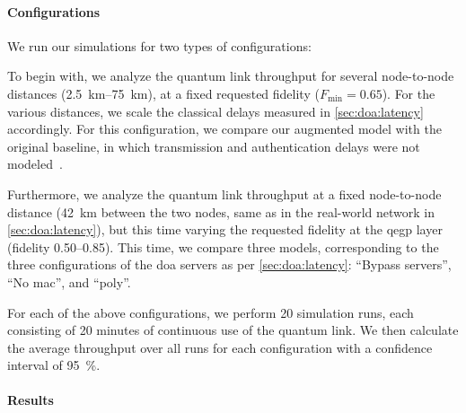 \paragraph{Configurations}

We run our simulations for two types of configurations:
%
\begin{inlinelist}
    \item To begin with, we analyze the quantum link throughput for several node-to-node distances
          (\qtyrange{2.5}{75}{\km}), at a fixed requested fidelity ($F_\text{min}=0.65$). For the
          various distances, we scale the classical delays measured in \cref{sec:doa:latency}
          accordingly. For this configuration, we compare our augmented model with the original
          baseline, in which transmission and authentication delays were not
          modeled~\cite{dahlberg_2019_egp}.
    \item Furthermore, we analyze the quantum link throughput at a fixed node-to-node distance
          (\qty{42}{\km} between the two nodes, same as in the real-world network in
          \cref{sec:doa:latency}), but this time varying the requested fidelity at the
          \acrshort{qegp} layer (fidelity \numrange{0.50}{0.85}). This time, we compare three
          models, corresponding to the three configurations of the \acrshort{doa} servers as per
          \cref{sec:doa:latency}: ``Bypass servers'', ``No \acrshort{mac}'', and
          ``\acrshort{poly}''.
\end{inlinelist}

For each of the above configurations, we perform \num{20} simulation runs, each consisting of
\num{20} minutes of continuous use of the quantum link. We then calculate the average throughput
over all runs for each configuration with a confidence interval of \qty{95}{\percent}.

\paragraph{Results}

